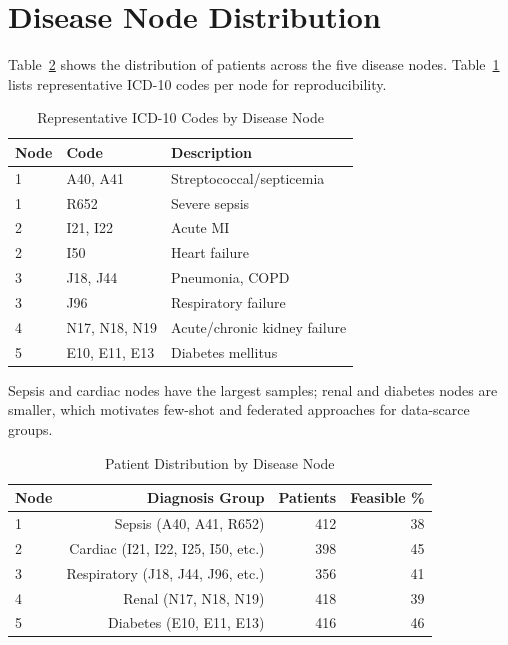 \section{Disease Node Distribution}

Table~\ref{tab:node_distribution} shows the distribution of patients across the five disease nodes. Table~\ref{tab:icd10_sample} lists representative ICD-10 codes per node for reproducibility.

\begin{table}[htbp]
\centering
\caption{Representative ICD-10 Codes by Disease Node}
\small
\begin{tabular}{llp{6cm}}
\toprule
Node & Code & Description \\
\midrule
1 & A40, A41 & Streptococcal/septicemia \\
1 & R652 & Severe sepsis \\
2 & I21, I22 & Acute MI \\
2 & I50 & Heart failure \\
3 & J18, J44 & Pneumonia, COPD \\
3 & J96 & Respiratory failure \\
4 & N17, N18, N19 & Acute/chronic kidney failure \\
5 & E10, E11, E13 & Diabetes mellitus \\
\bottomrule
\end{tabular}
\label{tab:icd10_sample}
\end{table}
 Sepsis and cardiac nodes have the largest samples; renal and diabetes nodes are smaller, which motivates few-shot and federated approaches for data-scarce groups.

\begin{table}[htbp]
\centering
\caption{Patient Distribution by Disease Node}
\begin{tabular}{lrrr}
\toprule
Node & Diagnosis Group & Patients & Feasible \% \\
\midrule
1 & Sepsis (A40, A41, R652) & 412 & 38 \\
2 & Cardiac (I21, I22, I25, I50, etc.) & 398 & 45 \\
3 & Respiratory (J18, J44, J96, etc.) & 356 & 41 \\
4 & Renal (N17, N18, N19) & 418 & 39 \\
5 & Diabetes (E10, E11, E13) & 416 & 46 \\
\bottomrule
\end{tabular}
\label{tab:node_distribution}
\end{table}

